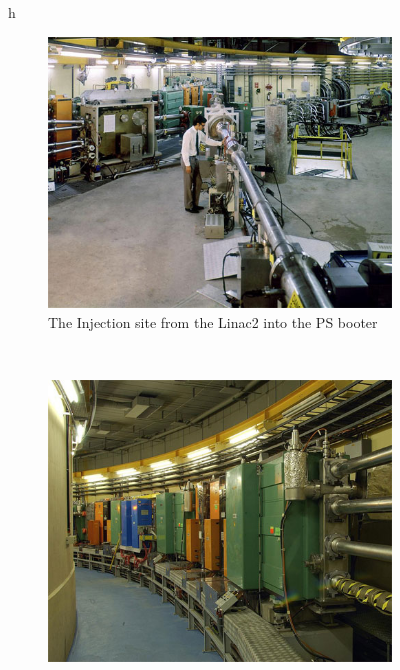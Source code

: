 \begin{figure}{h}
    \centering
    \begin{subfigure}[h]{0.4\textwidth}
        \includegraphics[width=\textwidth]{Figures/LHC_Diagrams/LHC__PSbooster__psb_injection.jpg}
        \caption{The Injection site from the Linac2 into the PS booter}\label{fig:linac2_to_psbooster_injection}
      \end{subfigure}
      ~ %
      \begin{subfigure}[h]{0.4\textwidth}
        \includegraphics[width=\textwidth]{Figures/LHC_Diagrams/LHC__PSbooster__psb_4_beamLines_shown.jpg}

\end{subfigure}
\end{figure}
